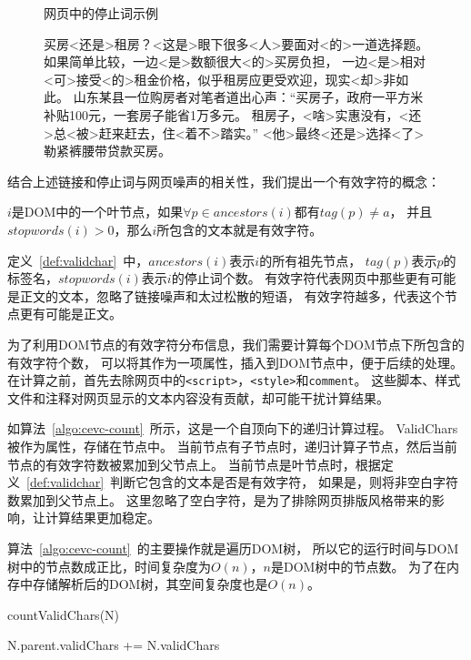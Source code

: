 \begin{figure}[htbp]
\begin{example}
\label{ex:stopwords}
网页中的停止词示例
\end{example}
买房<还是>租房？<这是>眼下很多<人>要面对<的>一道选择题。
如果简单比较，一边<是>数额很大<的>买房负担，
一边<是>相对<可>接受<的>租金价格，似乎租房应更受欢迎，现实<却>非如此。
山东某县一位购房者对笔者道出心声：“买房子，政府一平方米补贴100元，一套房子能省1万多元。
租房子，<啥>实惠没有，<还>总<被>赶来赶去，住<着不>踏实。”
<他>最终<还是>选择<了>勒紧裤腰带贷款买房。
\end{figure}

结合上述链接和停止词与网页噪声的相关性，我们提出一个有效字符的概念：

\begin{definition}
\label{def:validchar}
$i$是DOM中的一个叶节点，如果$\forall p \in ancestors(i)$都有$tag(p) \neq a$，
并且$stopwords(i) > 0$，那么$i$所包含的文本就是有效字符。
\end{definition}

定义~\ref{def:validchar}~中，$ancestors(i)$表示$i$的所有祖先节点，
$tag(p)$表示$p$的标签名，$stopwords(i)$表示$i$的停止词个数。
有效字符代表网页中那些更有可能是正文的文本，忽略了链接噪声和太过松散的短语，
有效字符越多，代表这个节点更有可能是正文。

为了利用DOM节点的有效字符分布信息，我们需要计算每个DOM节点下所包含的有效字符个数，
可以将其作为一项属性，插入到DOM节点中，便于后续的处理。
在计算之前，首先去除网页中的\texttt{<script>}，\texttt{<style>}和\texttt{comment}。
这些脚本、样式文件和注释对网页显示的文本内容没有贡献，却可能干扰计算结果。

如算法~\ref{algo:cevc-count}~所示，这是一个自顶向下的递归计算过程。
ValidChars被作为属性，存储在节点中。
当前节点有子节点时，递归计算子节点，然后当前节点的有效字符数被累加到父节点上。
当前节点是叶节点时，根据定义~\ref{def:validchar}~判断它包含的文本是否是有效字符，
如果是，则将非空白字符数累加到父节点上。
这里忽略了空白字符，是为了排除网页排版风格带来的影响，让计算结果更加稳定。

算法~\ref{algo:cevc-count}~的主要操作就是遍历DOM树，
所以它的运行时间与DOM树中的节点数成正比，时间复杂度为$O(n)$，$n$是DOM树中的节点数。
为了在内存中存储解析后的DOM树，其空间复杂度也是$O(n)$。

\begin{algorithm}[htbp]
\caption{countValidChars(N)}
\label{algo:cevc-count}

 {
  N.parent.validChars += N.validChars \;
}{
}
\end{algorithm}

